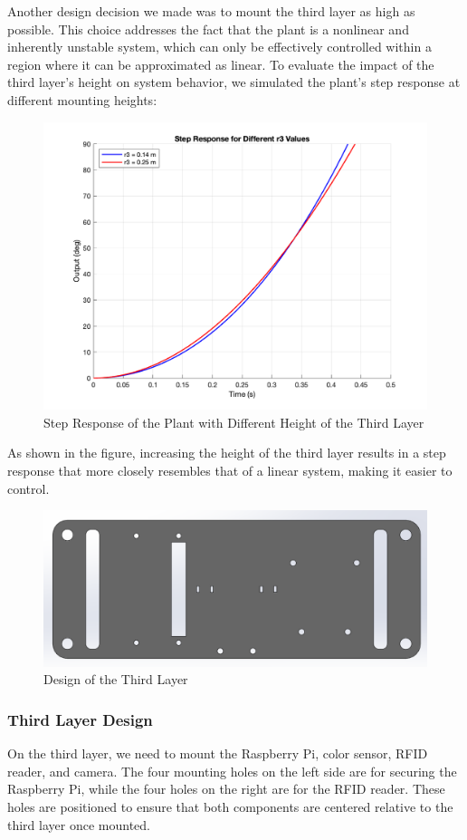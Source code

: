 \documentclass{article}
\begin{document}
Another design decision we made was to mount the third layer as high as
possible. This choice addresses the fact that the plant is a nonlinear and
inherently unstable system, which can only be effectively controlled within a
region where it can be approximated as linear. To evaluate the impact of the
third layer's height on system behavior, we simulated the plant's step response
at different mounting heights:
\begin{figure}[H]
    \centerline{\includegraphics[width=0.7\linewidth]{Figures/r3step.png}}
    \caption{Step Response of the Plant with Different Height of the Third Layer}
\end{figure}
As shown in the figure, increasing the height of the third layer results in a
step response that more closely resembles that of a linear system, making it
easier to control.

\begin{figure}[H]
    \centerline{\includegraphics[width=\linewidth]{Figures/3rdlayer.png}}
    \caption{Design of the Third Layer}
\end{figure}

\subsubsection{Third Layer Design}
On the third layer, we need to mount the Raspberry Pi, color sensor, RFID
reader, and camera. The four mounting holes on the left side are for securing
the Raspberry Pi, while the four holes on the right are for the RFID reader.
These holes are positioned to ensure that both components are centered relative
to the third layer once mounted.
\end{document}
